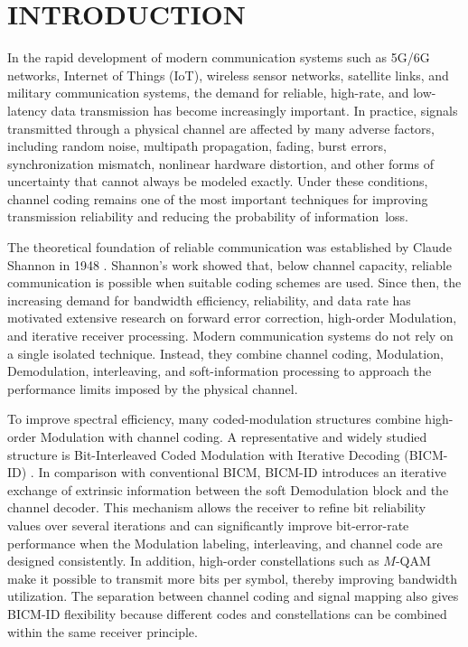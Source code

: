 \chapter*{INTRODUCTION}
In the rapid development of modern communication systems such as 5G/6G networks, Internet of Things (IoT), wireless sensor networks, satellite links, and military communication systems, the demand for reliable, high-rate, and low-latency data transmission has become increasingly important. In practice, signals transmitted through a physical channel are affected by many adverse factors, including random noise, multipath propagation, fading, burst errors, synchronization mismatch, nonlinear hardware distortion, and other forms of uncertainty that cannot always be modeled exactly. Under these conditions, channel coding remains one of the most important techniques for improving transmission reliability and reducing the probability of information~loss.

The theoretical foundation of reliable communication was established by Claude Shannon in 1948 \cite{shannon1948}. Shannon's work showed that, below channel capacity, reliable communication is possible when suitable coding schemes are used. Since then, the increasing demand for bandwidth efficiency, reliability, and data rate has motivated extensive research on forward error correction, high-order Modulation, and iterative receiver processing. Modern communication systems do not rely on a single isolated technique. Instead, they combine channel coding, Modulation, Demodulation, interleaving, and soft-information processing to approach the performance limits imposed by the physical channel.

To improve spectral efficiency, many coded-modulation structures combine high-order Modulation with channel coding. A representative and widely studied structure is Bit-Interleaved Coded Modulation with Iterative Decoding (BICM-ID) \cite{caire1998,li1997,li1998}. In comparison with conventional BICM, BICM-ID introduces an iterative exchange of extrinsic information between the soft Demodulation block and the channel decoder. This mechanism allows the receiver to refine bit reliability values over several iterations and can significantly improve bit-error-rate performance when the Modulation labeling, interleaving, and channel code are designed consistently. In addition, high-order constellations such as $M$-QAM make it possible to transmit more bits per symbol, thereby improving bandwidth utilization. The separation between channel coding and signal mapping also gives BICM-ID flexibility because different codes and constellations can be combined within the same receiver principle.

